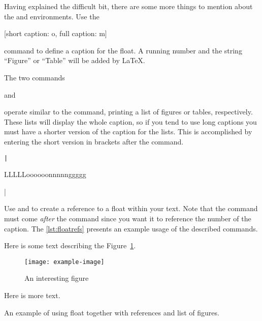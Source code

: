 Having explained the difficult bit, there are some more things to mention about
the  and  environments. Use the
\begin{lscommand}
  [short caption: o, full caption: m]
\end{lscommand}
command to define a caption for the float. A running number and
the string \enquote{Figure} or \enquote{Table} will be added by \LaTeX.

The two commands
\begin{lscommand}
   and 
\end{lscommand}
operate similar to the  command, printing a list of
figures or tables, respectively.  These lists will display the whole caption,
so if you tend to use long captions you must have a shorter version of the
caption for the lists. This is accomplished by entering the short version in
brackets after the  command.
\begin{code}
\texttt|\caption[Short]{LLLLLoooooonnnnnggggg}|
\end{code}

Use  and  to create a reference to a float within
your text. Note that the  command must come \emph{after} the
 command since you want it to reference the number of the
caption. The \autoref{lst:floatrefs} presents an example usage of the described
commands.
\begin{listing}
  \begin{lined}{11cm}
    \begin{example}[standalone, paperheight=4.5cm, to_page=2, vertical_pages]
\usepackage{graphicx} %
\geometry{includefoot} %
\listoffigures
\vspace{.3cm}%

Here is some text describing
the Figure~\ref{figure}.

\begin{figure}
  \centering
  \texttt{[image: example-image]}
  \caption[A figure]{An
    interesting figure}%
  \label{figure}
\end{figure}

Here is more text.
\end{example}
  \end{lined}
  \caption{An example of using  float together with references and
    list of figures.}\label{lst:floatrefs}
\end{listing}


